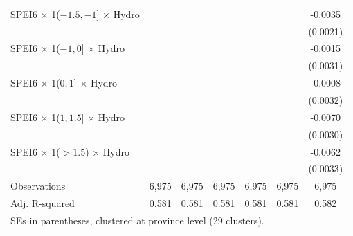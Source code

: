 {\begin{tabular}{l*{6}{c}}
\addlinespace
SPEI6 $\times$ 1($-1.5,-1$] $\times$ Hydro&                     &                     &                     &                     &                     &     -0.0035\sym{*}  \\
                    &                     &                     &                     &                     &                     &    (0.0021)         \\
\addlinespace
SPEI6 $\times$ 1($-1,0$] $\times$ Hydro&                     &                     &                     &                     &                     &     -0.0015         \\
                    &                     &                     &                     &                     &                     &    (0.0031)         \\
\addlinespace
SPEI6 $\times$ 1($0,1$] $\times$ Hydro&                     &                     &                     &                     &                     &     -0.0008         \\
                    &                     &                     &                     &                     &                     &    (0.0032)         \\
\addlinespace
SPEI6 $\times$ 1($1,1.5$] $\times$ Hydro&                     &                     &                     &                     &                     &     -0.0070\sym{**} \\
                    &                     &                     &                     &                     &                     &    (0.0030)         \\
\addlinespace
SPEI6 $\times$ 1($> 1.5$) $\times$ Hydro&                     &                     &                     &                     &                     &     -0.0062\sym{*}  \\
                    &                     &                     &                     &                     &                     &    (0.0033)         \\
\midrule
Observations        &       6,975         &       6,975         &       6,975         &       6,975         &       6,975         &       6,975         \\
Adj. R-squared      &       0.581         &       0.581         &       0.581         &       0.581         &       0.581         &       0.582         \\
\bottomrule
\multicolumn{7}{l}{\footnotesize SEs in parentheses, clustered at province level (29 clusters).}\\

\end{tabular}}
